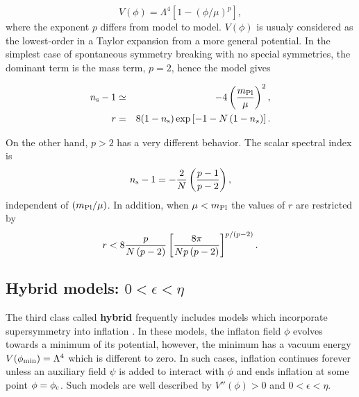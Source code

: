 \documentclass{rmaa}
\def\bea{\begin{eqnarray}}
\def\eea{\end{eqnarray}}
\begin{document}
\begin{equation}
V\left(\phi\right) = \Lambda^4 \left[1 - \left(\phi / \mu\right)^p\right],
\end{equation}
%
where the exponent $p$ differs from model to model. $V(\phi)$ is usualy considered as the 
lowest-order in a Taylor expansion from a more general potential.
In the simplest case of spontaneous symmetry breaking with no special symmetries, 
the dominant term is the mass term, $p = 2$, hence the model gives

\bea
n_{\rm s}-1&\simeq& -4\left( \frac{m_{\rm Pl}}{\mu}\right)^2, \nonumber \\
r &=& 8 (1 - n_{\rm s}) \exp\left[- 1 - N\left(1 - n_s\right)\right].
\eea

%
%
On the other
hand, $p > 2$ has a very different behavior. The scalar spectral index is
\begin{equation}
n_{\rm s}-1 = - {2 \over N} \left({p - 1 \over p - 2}\right),
\end{equation}
independent of $(m_{\rm Pl}/\mu)$. In addition, when $\mu < m_{\rm Pl}$ 
the values of $r$ are restricted by
\begin{equation}
r < 8 {p \over N \left(p - 2\right)} \left[{8 \pi \over N p \left(p -
2\right)}\right]^{p / \left(p - 2\right)}.
\end{equation}



\subsection{Hybrid models: $0 < \epsilon < \eta$}

The third class called \textbf{hybrid} frequently includes
models which incorporate supersymmetry into inflation \citep{Linde3, Copeland}. 
In these models, the inflaton field $\phi$ evolves
towards a minimum of its potential, however, the minimum has a vacuum energy 
$V(\phi_{\rm min}) = \Lambda^4$ which is different to zero. 
In such cases, inflation continues forever unless an
auxiliary field $\psi$ is added to interact with $\phi$ and ends inflation at some point $\phi = \phi_{\rm c}$. 
 Such models are well described by $V''\left(\phi\right) > 0$ and $0 < \epsilon < \eta$. 
\\
\end{document}

